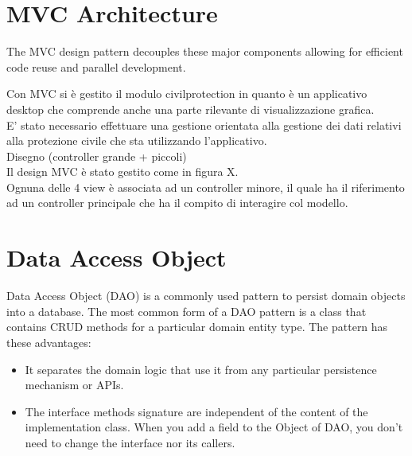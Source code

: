 \documentclass[a4paper,12pt]{report}
\begin{document}
\section{MVC Architecture}
The MVC design pattern decouples these major components allowing for efficient code reuse and parallel development.

Con MVC si è gestito il modulo civilprotection in quanto è un applicativo desktop che comprende anche una parte rilevante di visualizzazione grafica.\\
E' stato necessario effettuare una gestione orientata alla gestione dei dati relativi alla protezione civile che sta utilizzando l'applicativo.\\
Disegno (controller grande + piccoli)\\
Il design MVC è stato gestito come in figura X.\\
Ognuna delle 4 view è associata ad un controller minore, il quale ha il riferimento ad un controller principale che ha il compito di interagire col modello.


\section{Data Access Object}
Data Access Object (DAO) is a commonly used pattern to persist domain objects into a database. The most common form of a DAO pattern is a class that contains CRUD methods for a particular domain entity type.
The pattern has these advantages:
\begin{itemize}
\item It separates the domain logic that use it from any particular persistence mechanism or APIs.
\item The interface methods signature are independent of the content of the implementation class. When you add a field to the Object of DAO, you don’t need to change the interface nor its callers.
\end{itemize}
\end{document}
